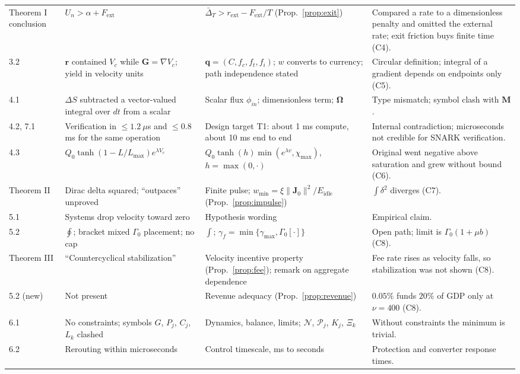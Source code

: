 \documentclass[11pt,a4paper]{article}
\theoremstyle{definition}
\theoremstyle{plain}
\theoremstyle{remark}
\begin{document}
\begin{longtable}{@{}p{1.9cm}p{4.0cm}p{5.2cm}p{4.1cm}@{}}
Theorem I conclusion & $U_n > \alpha + F_{\mathrm{ext}}$ & $\bar\Delta_T > r_{\mathrm{ext}} - F_{\mathrm{ext}}/T$ (Prop.~\ref{prop:exit}) & Compared a rate to a dimensionless penalty and omitted the external rate; exit friction buys finite time (C4). \\
3.2 & $\mathbf r$ contained $V_c$ while $\mathbf G = \nabla V_c$; yield in velocity units & $\mathbf q = (C, f_c, f_t, f_i)$; $w$ converts to currency; path independence stated & Circular definition; integral of a gradient depends on endpoints only (C5). \\
4.1 & $\Delta S$ subtracted a vector-valued integral over $dt$ from a scalar & Scalar flux $\phi_{in}$; dimensionless term; $\boldsymbol\Omega$ & Type mismatch; symbol clash with $\mathbf M$. \\
4.2, 7.1 & Verification in $\le 1.2\ \mu$s and $\le 0.8$ ms for the same operation & Design target T1: about 1 ms compute, about 10 ms end to end & Internal contradiction; microseconds not credible for SNARK verification. \\
4.3 & $Q_0\tanh(1 - L/L_{\max})e^{\lambda V_c}$ & $Q_0\tanh(h)\min(e^{\lambda v},\chi_{\max})$, $h = \max(0,\cdot)$ & Original went negative above saturation and grew without bound (C6). \\
Theorem II & Dirac delta squared; ``outpaces'' unproved & Finite pulse; $w_{\min} = \xi\|\mathbf J_0\|^2/E_{\mathrm{idle}}$ (Prop.~\ref{prop:impulse}) & $\int\delta^2$ diverges (C7). \\
5.1 & Systems drop velocity toward zero & Hypothesis wording & Empirical claim. \\
5.2 & $\oint$; bracket mixed $\Gamma_0$ placement; no cap & $\int$; $\gamma_f = \min\{\gamma_{\max}, \Gamma_0[\cdot]\}$ & Open path; limit is $\Gamma_0(1+\mu b)$ (C8). \\
Theorem III & ``Countercyclical stabilization'' & Velocity incentive property (Prop.~\ref{prop:fee}); remark on aggregate dependence & Fee rate rises as velocity falls, so stabilization was not shown (C8). \\
5.2 (new) & Not present & Revenue adequacy (Prop.~\ref{prop:revenue}) & $0.05\%$ funds $20\%$ of GDP only at $\nu = 400$ (C8). \\
6.1 & No constraints; symbols $G$, $P_j$, $C_j$, $L_k$ clashed & Dynamics, balance, limits; $\mathcal N$, $\mathcal P_j$, $K_j$, $\Xi_k$ & Without constraints the minimum is trivial. \\
6.2 & Rerouting within microseconds & Control timescale, ms to seconds & Protection and converter response times. \\

\end{longtable}
\end{document}
